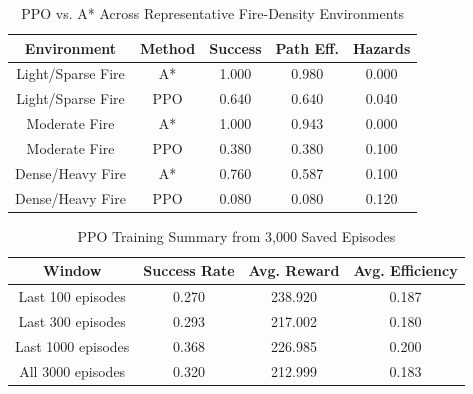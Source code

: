 \begin{table}[htbp]
\caption{PPO vs. A* Across Representative Fire-Density Environments}
\begin{center}
\begin{tabular}{|c|c|c|c|c|}
\hline
\textbf{Environment} & \textbf{Method} & \textbf{Success} & \textbf{Path Eff.} & \textbf{Hazards} \\
\hline
Light/Sparse Fire & A* & 1.000 & 0.980 & 0.000 \\
Light/Sparse Fire & PPO & 0.640 & 0.640 & 0.040 \\
\hline
Moderate Fire & A* & 1.000 & 0.943 & 0.000 \\
Moderate Fire & PPO & 0.380 & 0.380 & 0.100 \\
\hline
Dense/Heavy Fire & A* & 0.760 & 0.587 & 0.100 \\
Dense/Heavy Fire & PPO & 0.080 & 0.080 & 0.120 \\
\hline
\end{tabular}
\label{tab:fire_density_comparison}
\end{center}
\end{table}

\begin{table}[htbp]
\caption{PPO Training Summary from 3,000 Saved Episodes}
\begin{center}
\begin{tabular}{|c|c|c|c|}
\hline
\textbf{Window} & \textbf{Success Rate} & \textbf{Avg. Reward} & \textbf{Avg. Efficiency} \\
\hline
Last 100 episodes & 0.270 & 238.920 & 0.187 \\
Last 300 episodes & 0.293 & 217.002 & 0.180 \\
Last 1000 episodes & 0.368 & 226.985 & 0.200 \\
All 3000 episodes & 0.320 & 212.999 & 0.183 \\
\hline
\end{tabular}
\label{tab:ppo_3000_training_summary}
\end{center}
\end{table}

